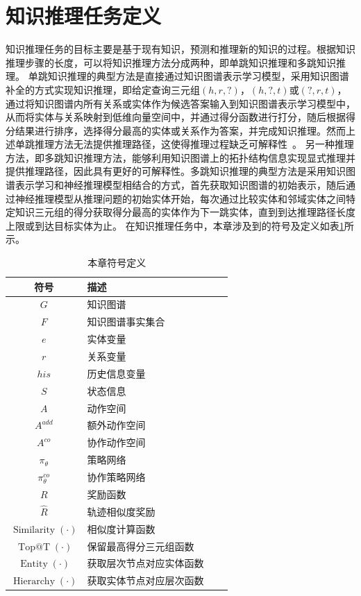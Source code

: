 \documentclass[algorithmlist, AutoFakeBold, AutoFakeSlant, figurelist, tablelist, nomlist, engineering]{seuthesix}
\begin{document}
\section{知识推理任务定义}
知识推理任务的目标主要是基于现有知识，预测和推理新的知识的过程。根据知识推理步骤的长度，可以将知识推理方法分成两种，即单跳知识推理和多跳知识推理。
单跳知识推理的典型方法是直接通过知识图谱表示学习模型，采用知识图谱补全的方式实现知识推理，即给定查询三元组$\left(h, r, ?\right)$，$\left(h, ?, t\right)$或$\left(?, r, t\right)$，通过将知识图谱内所有关系或实体作为候选答案输入到知识图谱表示学习模型中，从而将实体与关系映射到低维向量空间中，并通过得分函数进行打分，随后根据得分结果进行排序，选择得分最高的实体或关系作为答案，并完成知识推理。然而上述单跳推理方法无法提供推理路径，这使得推理过程缺乏可解释性~\cite{wang2019deeppath}。
另一种推理方法，即多跳知识推理方法，能够利用知识图谱上的拓扑结构信息实现显式推理并提供推理路径，因此具有更好的可解释性。多跳知识推理的典型方法是采用知识图谱表示学习和神经推理模型相结合的方式，首先获取知识图谱的初始表示，随后通过神经推理模型从推理问题的初始实体开始，每次通过比较实体和邻域实体之间特定知识三元组的得分获取得分最高的实体作为下一跳实体，直到到达推理路径长度上限或到达目标实体为止。
在知识推理任务中，本章涉及到的符号及定义如表\ref{3_symbols}所示。
\begin{table}[t]
  \centering
  \begin{tabular*}{0.6\textwidth}{@{\extracolsep{\fill}}clcl}
		\toprule[1pt]
    符号 & 描述\\ \hline
    $G$ & 知识图谱\\
    $F$ & 知识图谱事实集合\\
    $e$ & 实体变量\\
    $r$ & 关系变量\\
    $his$ & 历史信息变量\\
    $S$ & 状态信息\\
    $A$ & 动作空间\\
    $A^{add}$ & 额外动作空间\\
    $A^{co}$ & 协作动作空间\\
    $\pi_\theta$ & 策略网络\\
    $\pi_\theta^{co}$ & 协作策略网络\\
    $R$ & 奖励函数\\
    $\hat{R}$ & 轨迹相似度奖励\\
    $\operatorname{Similarity}(\cdot)$ & 相似度计算函数\\
    $\operatorname{Top@T}(\cdot)$ & 保留最高得分三元组函数\\
    $\operatorname{Entity}(\cdot)$ & 获取层次节点对应实体函数\\
    $\operatorname{Hierarchy}(\cdot)$ & 获取实体节点对应层次函数\\
		\bottomrule[1pt]
	\end{tabular*}
  \caption{本章符号定义}
  \label{3_symbols}
\end{table}
\end{document}
